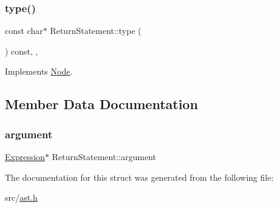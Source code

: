 \subsubsection{\texorpdfstring{type()}{type()}}
{\footnotesize\ttfamily const char$\ast$ Return\+Statement\+::type (\begin{DoxyParamCaption}{ }\end{DoxyParamCaption}) const\hspace{0.3cm}{\ttfamily [inline]}, {\ttfamily [override]}, {\ttfamily [virtual]}}



Implements \hyperlink{struct_node_a82f29420d0a38efcc370352528e94e9b}{Node}.



\subsection{Member Data Documentation}
\mbox{\label{struct_return_statement_aeead2cb2bcecfed685d54bb7ee5456f2}} 
\subsubsection{\texorpdfstring{argument}{argument}}
{\footnotesize\ttfamily \hyperlink{struct_expression}{Expression}$\ast$ Return\+Statement\+::argument}



The documentation for this struct was generated from the following file\+:\begin{DoxyCompactItemize}
\item 
src/\hyperlink{ast_8h}{ast.\+h}\end{DoxyCompactItemize}

